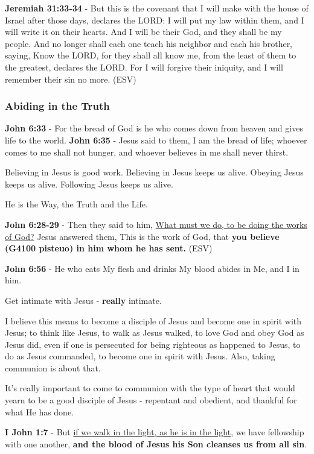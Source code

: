 \documentclass[11pt]{article}
\begin{document}
\textbf{Jeremiah 31:33-34} - But this is the covenant that I will make with the house of Israel after those days, declares the LORD: I will put my law within them, and I will write it on their hearts.  And I will be their God, and they shall be my people.  And no longer shall each one teach his neighbor and each his brother, saying, Know the LORD, for they shall all know me, from the least of them to the greatest, declares the LORD.  For I will forgive their iniquity, and I will remember their sin no more.  (ESV)

\subsubsection{Abiding in the Truth}
\label{sec:org4d13dfa}
\textbf{John 6:33} - For the bread of God is he who comes down from heaven and gives life to the world.
\textbf{John 6:35} - Jesus said to them, I am the bread of life; whoever comes to me shall not hunger, and whoever believes in me shall never thirst.

Believing in Jesus is good work.
Believing in Jesus keeps us alive.
Obeying Jesus keeps us alive.
Following Jesus keeps us alive.

He is the Way, the Truth and the Life.

\textbf{John 6:28-29} - Then they said to him, \uline{What must we do, to be doing the works of God?} Jesus answered them, This is the work of God, that \textbf{you believe (G4100 pisteuo) in him whom he has sent.} (ESV)

\textbf{John 6:56} - He who eats My flesh and drinks My blood abides in Me, and I in him.

Get intimate with Jesus - \textbf{really} intimate.

I believe this means to become a disciple of Jesus and become one in spirit with Jesus; to think like Jesus, to walk as Jesus walked, to love God and obey God as Jesus did, even if one is persecuted for being righteous as happened to Jesus, to do as Jesus commanded, to become one in spirit with Jesus. Also, taking communion is about that.

It's really important to come to communion with the type of heart that would yearn to be a good disciple of Jesus - repentant and obedient, and thankful for what He has done.

\textbf{I John 1:7} - But \uline{if we walk in the light, as he is in the light}, we have fellowship with one another, \textbf{and the blood of Jesus his Son cleanses us from all sin}.
\end{document}
